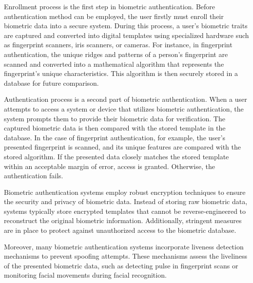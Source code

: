 Enrollment process is the first step in biometric authentication. Before authentication method
can be employed, the user firstly must enroll their biometric data into a secure system.
During this process, a user's biometric traits are captured and converted into digital templates using specialized hardware such as fingerprint scanners, iris scanners, or cameras. For instance, in fingerprint authentication, the unique ridges and 
patterns of a person's fingerprint are scanned and converted into a mathematical 
algorithm that represents the fingerprint's unique characteristics. This algorithm 
is then securely stored in a database for future comparison.

Authentication process is a second part of biometric authentication. When a user 
attempts to access a system or device that utilizes biometric authentication, the 
system prompts them to provide their biometric data for verification. The captured 
biometric data is then compared with the stored template in the database. In 
the case of fingerprint authentication, for example, the user's presented 
fingerprint is scanned, and its unique features are compared with the stored 
algorithm. If the presented data closely matches the stored template within an 
acceptable margin of error, access is granted. Otherwise, the authentication fails.

Biometric authentication systems employ robust encryption techniques to ensure the security and privacy of biometric data. Instead of storing raw biometric data, systems typically store encrypted templates that cannot be reverse-engineered to reconstruct the original biometric information. Additionally, stringent measures are in place to protect against unauthorized access to the biometric database.

Moreover, many biometric authentication systems incorporate liveness detection mechanisms to prevent spoofing attempts. These mechanisms assess the liveliness of the presented biometric data, such as detecting pulse in fingerprint scans or monitoring facial movements during facial recognition.

